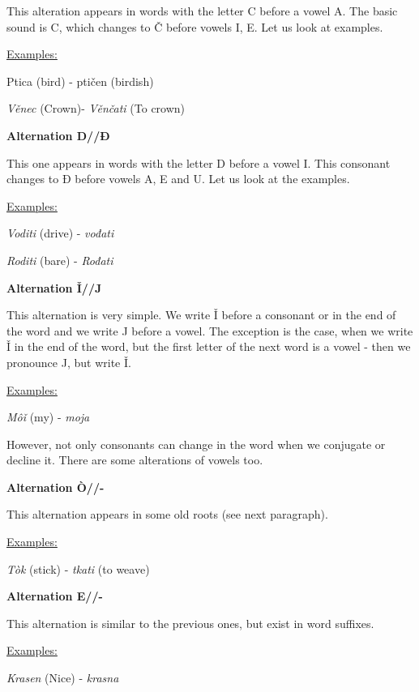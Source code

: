 This alteration appears in words with the letter C before a vowel A. The basic sound is C, which changes to Č before vowels I, E. Let us look at examples.

\underline{Examples:}

Ptica (bird) \textipa{[’pti\t{ts}a]} - ptičen (birdish) \textipa{[’pti\t{tS}en]}

\textit{Věnec} \textipa{['vIne\t{ts}]} (Crown)- \textit{Věnčati}  (To crown)

\textbf{Alternation D//Đ}

This one appears in words with the letter D before a vowel I. This consonant changes to Đ before vowels A, E and U. Let us look at the examples.

\underline{Examples:}

\textit{Voditi} (drive) \textipa{[‘vodit1]} - \textit{vođati} 

\textit{Roditi} \textipa{[‘rodit1]} (bare) - \textit{Rođati} 

\textbf{Alternation Ǐ//J}

This alternation is very simple. We write Ǐ before a consonant or in the end of the word and we write J before a vowel. The exception is the case, when we write Ǐ in the end of the word, but the first letter of the next word is a vowel - then we pronounce J, but write Ǐ.

\underline{Examples:}

\textit{Môǐ} (my) \textipa{[mUj]} - \textit{moja} \textipa{[m2'Ja]}

However, not only consonants can change in the word when we conjugate or decline it. There are some alterations of vowels too.

\textbf{Alternation Ò//-}

This alternation appears in some old roots (see next paragraph).

\underline{Examples:}

\textit{Tòk} (stick) \textipa{[t@k]} - \textit{tkati} \textipa{['tkatI]} (to weave)


\textbf{Alternation E//-}

This alternation is similar to the previous ones, but exist in word suffixes.

\underline{Examples:}

\textit{Krasen} (Nice) \textipa{['kras@n]} - \textit{krasna} \textipa{['krasna]}


